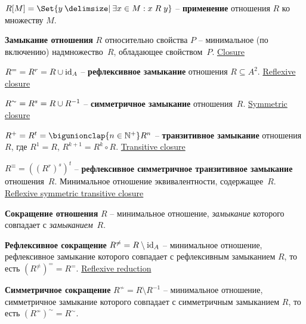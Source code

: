 \documentclass[a4paper,10pt]{article}
\begin{document}
\begin{terms}
    \item $R[M] = \Set{y \given \exists x \in M : x \rel y}$ \--- \textbf{применение} отношения $R$ ко множеству $M$.

    \item \textbf{Замыкание отношения} $R$ относительно свойства $P$ \--- минимальное (по включению) надмножество~$R$, обладающее свойством~$P$.
    \hfill\href{https://en.wikipedia.org/wiki/Closure_(mathematics)#Binary_relation_closures}{Closure}

    \begin{terms}
        \item $R^{=} = R^{r} = R \cup \mathrm{id}_{A}$ \--- \textbf{рефлексивное замыкание} отношения $R \subseteq A^2$.
        \hfill\href{https://en.wikipedia.org/wiki/Reflexive_closure}{Reflexive closure}

        \item $R^{\sim} = R^{s} = R \cup R^{-1}$ \--- \textbf{симметричное замыкание} отношения~$R$.
        \hfill\href{https://en.wikipedia.org/wiki/Symmetric_closure}{Symmetric closure}

        \item $R^{+} = R^{t} = \bigunionclap{n \in \NaturalPlus} R^n$ \--- \textbf{транзитивное замыкание} отношения $R$, где $R^1 = R$, $R^{k+1} = R^k \circ R$.
        \hfill\href{https://en.wikipedia.org/wiki/Transitive_closure}{Transitive closure}

        \item $R^{\equiv} = ((R^{r})^{s})^{t}$ \--- \textbf{рефлексивное симметричное транзитивное замыкание} отношения~$R$. Минимальное отношение эквивалентности, содержащее~$R$.
        \hfill\href{https://en.wikipedia.org/wiki/Reflexive_symmetric_transitive_closure}{Reflexive symmetric transitive closure}
    \end{terms}

    \item \textbf{Сокращение отношения} $R$ \--- минимальное отношение, \textit{замыкание} которого совпадает с \textit{замыканием}~$R$.

    \begin{terms}
        \item \textbf{Рефлексивное сокращение} $R^{\neq} = R \setminus \mathrm{id}_{A}$ \--- минимальное отношение, рефлексивное замыкание которого совпадает с рефлексивным замыканием $R$, то есть $(R^{\neq})^{=} = R^{=}$.
        \hfill\href{https://en.wikipedia.org/wiki/Reflexive_reduction}{Reflexive reduction}

        \item \textbf{Симметричное сокращение} $R^{\nsim} = R \setminus R^{-1}$ \--- минимальное отношение, симметричное замыкание которого совпадает с симметричным замыканием $R$, то есть $(R^{\nsim})^{\sim} = R^{\sim}$.


\end{terms}
\end{terms}
\end{document}
